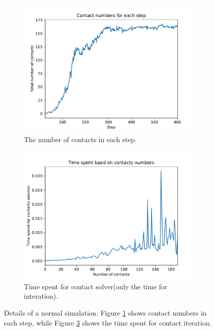     \begin{figure}[!ht]
        \centering
        \begin{subfigure}[b]{0.7\textwidth}
            \includegraphics[width=\textwidth]{Figures/contact_num}
            \caption{The number of contacts in each step.}
            \label{fig:contactnum}
        \end{subfigure}
        \begin{subfigure}[b]{0.7\textwidth}
            \includegraphics[width=\textwidth]{Figures/contact_time}
            \caption{Time spent for contact solver(only the time for interation).}
            \label{fig:contacttime}
        \end{subfigure}
        \caption{Details of a normal simulation. Figure \ref{fig:contactnum} shows contact numbers in each step, while Figure \ref{fig:contacttime} shows the time spent for contact iteration.}
    \end{figure}

